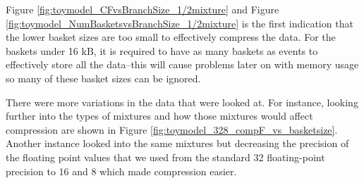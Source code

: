 Figure \ref{fig:toymodel_CFvsBranchSize_1/2mixture} and Figure \ref{fig:toymodel_NumBasketsvsBranchSize_1/2mixture} is the first indication that the lower basket sizes are too small to effectively compress the data. 
For the baskets under 16 kB, it is required to have as many baskets as events to effectively store all the data--this will cause problems later on with memory usage so many of these basket sizes can be ignored.

There were more variations in the data that were looked at. 
For instance, looking further into the types of mixtures and how those mixtures would affect compression are shown in Figure \ref{fig:toymodel_328_compF_vs_basketsize}. 
Another instance looked into the same mixtures but decreasing the precision of the floating point values that we used from the standard 32 floating-point precision to 16 and 8 which made compression easier. 


